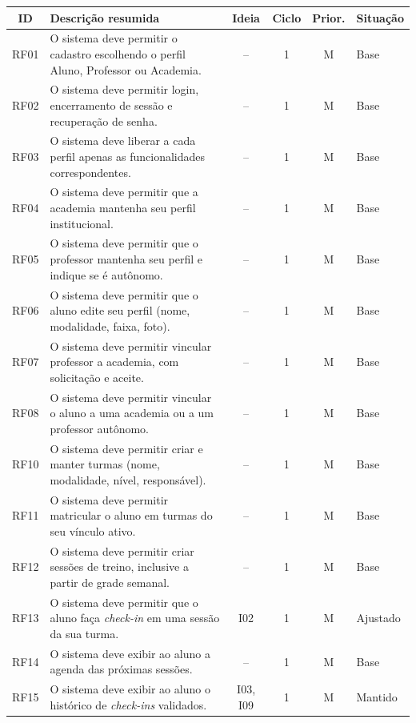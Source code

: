 \begin{quadro}[!htb]
  \caption{Requisitos funcionais dos Ciclos 1 e 2}
  \label{qua:rf}
  \centering
  \footnotesize
  \begin{tabular}{|c|p{7.3cm}|c|c|c|p{1.6cm}|}
    \hline
    \textbf{ID} & \textbf{Descrição resumida} & \textbf{Ideia} & \textbf{Ciclo} & \textbf{Prior.} & \textbf{Situação} \\ \hline
    RF01 & O sistema deve permitir o cadastro escolhendo o perfil Aluno, Professor ou Academia. & -- & 1 & M & Base \\ \hline
    RF02 & O sistema deve permitir login, encerramento de sessão e recuperação de senha. & -- & 1 & M & Base \\ \hline
    RF03 & O sistema deve liberar a cada perfil apenas as funcionalidades correspondentes. & -- & 1 & M & Base \\ \hline
    RF04 & O sistema deve permitir que a academia mantenha seu perfil institucional. & -- & 1 & M & Base \\ \hline
    RF05 & O sistema deve permitir que o professor mantenha seu perfil e indique se é autônomo. & -- & 1 & M & Base \\ \hline
    RF06 & O sistema deve permitir que o aluno edite seu perfil (nome, modalidade, faixa, foto). & -- & 1 & M & Base \\ \hline
    RF07 & O sistema deve permitir vincular professor a academia, com solicitação e aceite. & -- & 1 & M & Base \\ \hline
    RF08 & O sistema deve permitir vincular o aluno a uma academia ou a um professor autônomo. & -- & 1 & M & Base \\ \hline
    RF10 & O sistema deve permitir criar e manter turmas (nome, modalidade, nível, responsável). & -- & 1 & M & Base \\ \hline
    RF11 & O sistema deve permitir matricular o aluno em turmas do seu vínculo ativo. & -- & 1 & M & Base \\ \hline
    RF12 & O sistema deve permitir criar sessões de treino, inclusive a partir de grade semanal. & -- & 1 & M & Base \\ \hline
    RF13 & O sistema deve permitir que o aluno faça \textit{check-in} em uma sessão da sua turma. & I02 & 1 & M & Ajustado \\ \hline
    RF14 & O sistema deve exibir ao aluno a agenda das próximas sessões. & -- & 1 & M & Base \\ \hline
    RF15 & O sistema deve exibir ao aluno o histórico de \textit{check-ins} validados. & I03, I09 & 1 & M & Mantido \\ \hline

\end{tabular}
\end{quadro}
